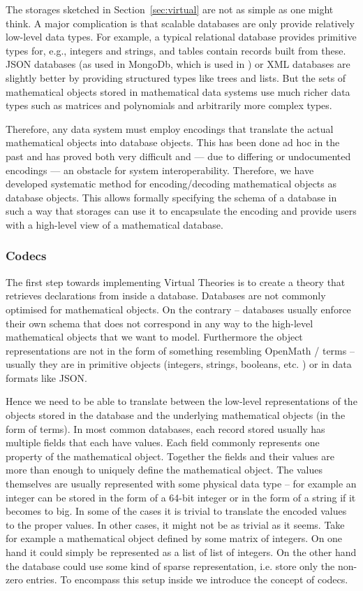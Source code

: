 The storages sketched in Section~\ref{sec:virtual} are not as simple as one might think.
A major complication is that scalable databases are only provide relatively low-level data types.
For example, a typical relational database provides primitive types for, e.g., integers and strings, and tables contain records built from these.
JSON databases (as used in MongoDb\cite{}, which is used in \LMFDB) or XML databases are slightly better by providing structured types like trees and lists.
But the sets of mathematical objects stored in mathematical data systems use much richer data types such as matrices and polynomials and arbitrarily more complex types.

Therefore, any data system must employ encodings that translate the actual mathematical objects into database objects.
This has been done ad hoc in the past and has proved both very difficult and --- due to differing or undocumented encodings --- an obstacle for system interoperability.
Therefore, we have developed systematic method for encoding/decoding mathematical objects as database objects.
This allows formally specifying the schema of a database in such a way that \MMT storages can use it to encapsulate the encoding and provide users with a high-level view of a mathematical database.

\subsubsection{Codecs}

The first step towards implementing Virtual Theories is to create a theory that retrieves
declarations from inside a database. Databases are not commonly optimised for mathematical
objects. On the contrary -- databases usually enforce their own schema that does not
correspond in any way to the high-level mathematical objects that we want to
model. Furthermore the object representations are not in the form of something resembling
OpenMath / \MMT terms -- usually they are in primitive objects (integers, strings,
booleans, etc. ) or in data formats like JSON.

Hence we need to be able to translate between the low-level representations of the objects
stored in the database and the underlying mathematical objects (in the form of \MMT terms). In
most common databases, each record stored usually has multiple fields that each have values.
Each field commonly represents one property of the mathematical object. Together the fields and
their values are more than enough to uniquely define the mathematical object. The values
themselves are usually represented with some physical data type -- for example an integer can
be stored in the form of a 64-bit integer or in the form of a string if it becomes to big. In
some of the cases it is trivial to translate the encoded values to the proper values. In other
cases, it might not be as trivial as it seems. Take for example a mathematical object defined
by some matrix of integers. On one hand it could simply be represented as a list of list of
integers. On the other hand the database could use some kind of sparse representation, i.e.
store only the non-zero entries. To encompass this setup inside \MMT we introduce the concept
of codecs.

